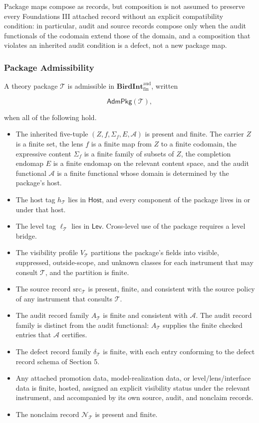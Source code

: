 \documentclass[11pt]{article}
\providecommand{\tightlist}{}
\theoremstyle{definition}
\begin{document}
Package maps compose as records, but composition is not assumed to preserve every Foundations III attached record without an explicit compatibility condition: in particular, audit and source records compose only when the audit functionals of the codomain extend those of the domain, and a composition that violates an inherited audit condition is a defect, not a new package map.

\subsubsection{Package Admissibility}

A theory package \(\mathcal T\) is admissible in \(\mathbf{BirdInt}^{\mathrm{aud}}_{\mathrm{fin}}\), written

\[
\mathsf{AdmPkg}(\mathcal T),
\]

when all of the following hold.

\begin{itemize}
\tightlist
\item
  The inherited five-tuple \((Z,f,\Sigma_f,E,\mathcal A)\) is present and finite. The carrier \(Z\) is a finite set, the lens \(f\) is a finite map from \(Z\) to a finite codomain, the expressive content \(\Sigma_f\) is a finite family of subsets of \(Z\), the completion endomap \(E\) is a finite endomap on the relevant content space, and the audit functional \(\mathcal A\) is a finite functional whose domain is determined by the package's host.
\item
  The host tag \(h_{\mathcal T}\) lies in \(\mathsf{Host}\), and every component of the package lives in or under that host.
\item
  The level tag \(\ell_{\mathcal T}\) lies in \(\mathsf{Lev}\). Cross-level use of the package requires a level bridge.
\item
  The visibility profile \(V_{\mathcal T}\) partitions the package's fields into visible, suppressed, outside-scope, and unknown classes for each instrument that may consult \(\mathcal T\), and the partition is finite.
\item
  The source record \(\mathrm{src}_{\mathcal T}\) is present, finite, and consistent with the source policy of any instrument that consults \(\mathcal T\).
\item
  The audit record family \(A_{\mathcal T}\) is finite and consistent with \(\mathcal A\). The audit record family is distinct from the audit functional: \(A_{\mathcal T}\) supplies the finite checked entries that \(\mathcal A\) certifies.
\item
  The defect record family \(\delta_{\mathcal T}\) is finite, with each entry conforming to the defect record schema of Section 5.
\item
  Any attached promotion data, model-realization data, or level/lens/interface data is finite, hosted, assigned an explicit visibility status under the relevant instrument, and accompanied by its own source, audit, and nonclaim records.
\item
  The nonclaim record \(\mathcal N_{\mathcal T}\) is present and finite.
\end{itemize}
\end{document}
